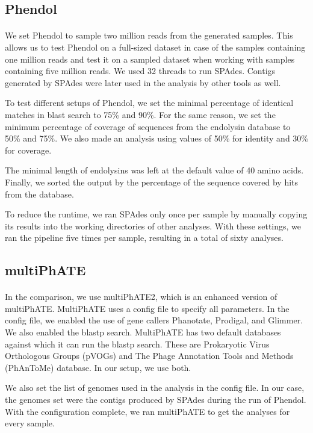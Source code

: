 \subsection{Phendol}
\paragraph*{}
We set Phendol to sample two million reads from the generated samples. This allows us to test Phendol on a full-sized dataset in case of the samples containing one million reads and test it on a sampled dataset when working with samples containing five million reads. We used 32 threads to run SPAdes. Contigs generated by SPAdes were later used in the analysis by other tools as well.

To test different setups of Phendol, we set the minimal percentage of identical matches in blast search to 75\% and 90\%. For the same reason, we set the minimum percentage of coverage of sequences from the endolysin database to 50\% and 75\%. We also made an analysis using values of 50\% for identity and 30\% for coverage.

The minimal length of endolysins was left at the default value of 40 amino acids. Finally, we sorted the output by the percentage of the sequence covered by hits from the database.

To reduce the runtime, we ran SPAdes only once per sample by manually copying its results into the working directories of other analyses. With these settings, we ran the pipeline five times per sample, resulting in a total of sixty analyses.

\subsection{multiPhATE}
\paragraph*{}
In the comparison, we use multiPhATE2, which is an enhanced version of multiPhATE. MultiPhATE uses a config file to specify all parameters. In the config file, we enabled the use of gene callers Phanotate, Prodigal, and Glimmer. We also enabled the blastp search. MultiPhATE has two default databases against which it can run the blastp search. These are Prokaryotic Virus Orthologous Groups (pVOGs) \cite{grazziotin2016prokaryotic} and The Phage Annotation Tools and Methods (PhAnToMe) database. In our setup, we use both.

We also set the list of genomes used in the analysis in the config file. In our case, the genomes set were the contigs produced by SPAdes during the run of Phendol. With the configuration complete, we ran multiPhATE to get the analyses for every sample.

